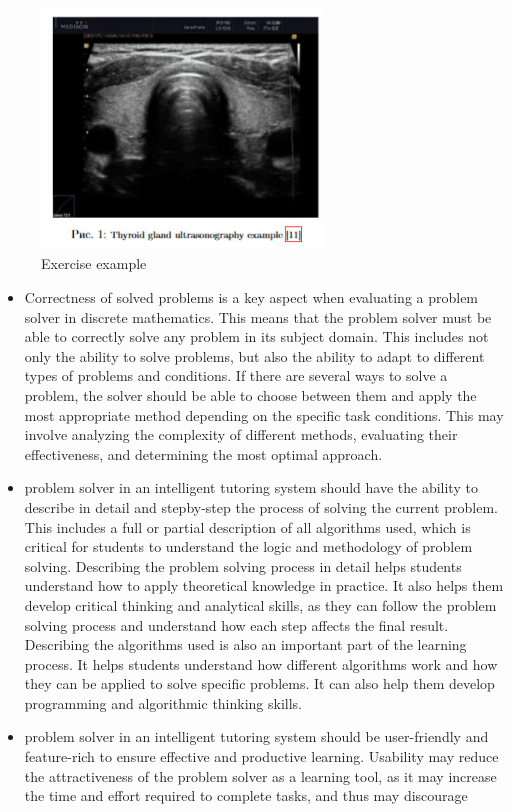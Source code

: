 \documentclass[a4paper]{article}
\begin{document}
\setlength\parindent{11pt}
\fontsize{10}{11}\selectfont


\setlength\parindent{0pt} %
\begin{multicols}{2}

\setcounter{figure}{4}
\begin{figure}[H] 
  \centering
  \includegraphics[width=7.5cm]{1.jpg}
  \caption{ Exercise example}
\end{figure}
\begin{itemize}
  \renewcommand{\labelitemi}{1)}
\item Correctness of solved problems is a key aspect when
evaluating a problem solver in discrete mathematics.
This means that the problem solver must be able to
correctly solve any problem in its subject domain.
This includes not only the ability to solve problems,
but also the ability to adapt to different types of
problems and conditions. If there are several ways
to solve a problem, the solver should be able to
choose between them and apply the most appropriate method depending on the specific task conditions. This may involve analyzing the complexity of
different methods, evaluating their effectiveness, and
determining the most optimal approach.
 \renewcommand{\labelitemi}{2)}
\item problem solver in an intelligent tutoring system
should have the ability to describe in detail and stepby-step the process of solving the current problem.
This includes a full or partial description of all
algorithms used, which is critical for students to
understand the logic and methodology of problem
solving.
Describing the problem solving process in detail
helps students understand how to apply theoretical
knowledge in practice. It also helps them develop
critical thinking and analytical skills, as they can
follow the problem solving process and understand
how each step affects the final result.
Describing the algorithms used is also an important
part of the learning process. It helps students understand how different algorithms work and how they
can be applied to solve specific problems. It can also
help them develop programming and algorithmic
thinking skills.
 \renewcommand{\labelitemi}{3)}
\item problem solver in an intelligent tutoring system
should be user-friendly and feature-rich to ensure
effective and productive learning. Usability may
reduce the attractiveness of the problem solver as a
learning tool, as it may increase the time and effort
required to complete tasks, 
and thus  \columnbreak may discourage



\end{itemize}
\end{multicols}
\end{document}
